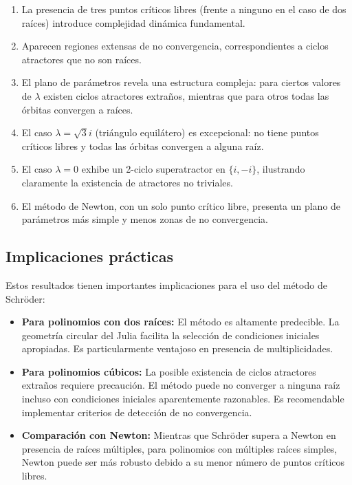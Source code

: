 \begin{enumerate}
\item La presencia de tres puntos críticos libres (frente a ninguno en el caso de dos raíces) introduce complejidad dinámica fundamental.

\item Aparecen regiones extensas de no convergencia, correspondientes a ciclos atractores que no son raíces.

\item El plano de parámetros revela una estructura compleja: para ciertos valores de $\lambda$ existen ciclos atractores extraños, mientras que para otros todas las órbitas convergen a raíces.

\item El caso $\lambda=\sqrt{3}i$ (triángulo equilátero) es excepcional: no tiene puntos críticos libres y todas las órbitas convergen a alguna raíz.

\item El caso $\lambda=0$ exhibe un 2-ciclo superatractor en $\{i,-i\}$, ilustrando claramente la existencia de atractores no triviales.

\item El método de Newton, con un solo punto crítico libre, presenta un plano de parámetros más simple y menos zonas de no convergencia.
\end{enumerate}

\subsection{Implicaciones prácticas}

Estos resultados tienen importantes implicaciones para el uso del método de Schröder:

\begin{itemize}
\item \textbf{Para polinomios con dos raíces:} El método es altamente predecible. La geometría circular del Julia facilita la selección de condiciones iniciales apropiadas. Es particularmente ventajoso en presencia de multiplicidades.

\item \textbf{Para polinomios cúbicos:} La posible existencia de ciclos atractores extraños requiere precaución. El método puede no converger a ninguna raíz incluso con condiciones iniciales aparentemente razonables. Es recomendable implementar criterios de detección de no convergencia.

\item \textbf{Comparación con Newton:} Mientras que Schröder supera a Newton en presencia de raíces múltiples, para polinomios con múltiples raíces simples, Newton puede ser más robusto debido a su menor número de puntos críticos libres.
\end{itemize}

